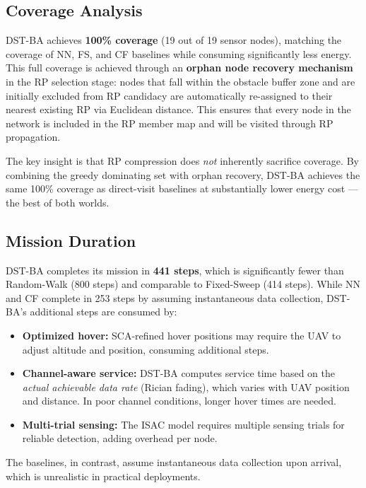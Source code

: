 \documentclass[12pt, a4paper, oneside]{report}
\begin{document}
\subsection{Coverage Analysis}

DST-BA achieves \textbf{100\% coverage} (19 out of 19 sensor nodes), matching the coverage of NN, FS, and CF baselines while consuming significantly less energy. This full coverage is achieved through an \textbf{orphan node recovery mechanism} in the RP selection stage: nodes that fall within the obstacle buffer zone and are initially excluded from RP candidacy are automatically re-assigned to their nearest existing RP via Euclidean distance. This ensures that every node in the network is included in the RP member map and will be visited through RP propagation.

The key insight is that RP compression does \textit{not} inherently sacrifice coverage. By combining the greedy dominating set with orphan recovery, DST-BA achieves the same 100\% coverage as direct-visit baselines at substantially lower energy cost --- the best of both worlds.

\subsection{Mission Duration}

DST-BA completes its mission in \textbf{441 steps}, which is significantly fewer than Random-Walk (800 steps) and comparable to Fixed-Sweep (414 steps). While NN and CF complete in 253 steps by assuming instantaneous data collection, DST-BA's additional steps are consumed by:
\begin{itemize}
    \item \textbf{Optimized hover:} SCA-refined hover positions may require the UAV to adjust altitude and position, consuming additional steps.
    \item \textbf{Channel-aware service:} DST-BA computes service time based on the \textit{actual achievable data rate} (Rician fading), which varies with UAV position and distance. In poor channel conditions, longer hover times are needed.
    \item \textbf{Multi-trial sensing:} The ISAC model requires multiple sensing trials for reliable detection, adding overhead per node.
\end{itemize}

The baselines, in contrast, assume instantaneous data collection upon arrival, which is unrealistic in practical deployments.
\end{document}
